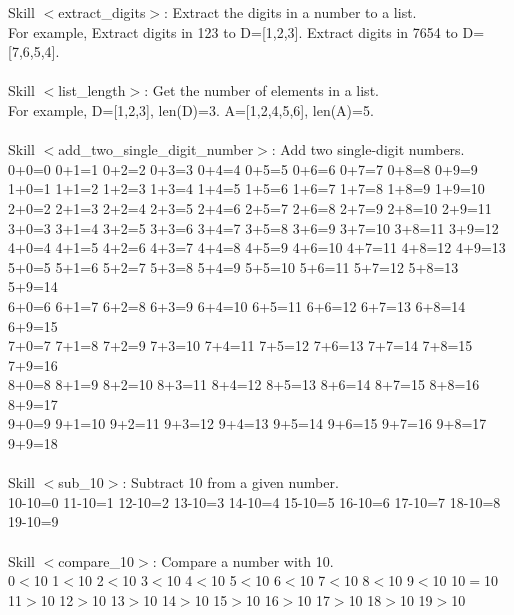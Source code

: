 \documentclass{article} %
\begin{document}
\begin{tcolorbox}[title = {Skills for Addition}, colback = Apricot!25!white, colframe = BrickRed!75!black] 
Skill $<$extract\_digits$>$: Extract the digits in a number to a list.  \\
For example, Extract digits in 123 to D=[1,2,3]. Extract digits in 7654 to D=[7,6,5,4]. \\ \\

Skill $<$list\_length$>$: Get the number of elements in a list.  \\
For example, D=[1,2,3], len(D)=3. A=[1,2,4,5,6], len(A)=5. \\ \\

Skill $<$add\_two\_single\_digit\_number$>$: Add two single-digit numbers.  \\
0+0=0 0+1=1 0+2=2 0+3=3 0+4=4 0+5=5 0+6=6 0+7=7 0+8=8 0+9=9 \\
1+0=1 1+1=2 1+2=3 1+3=4 1+4=5 1+5=6 1+6=7 1+7=8 1+8=9 1+9=10 \\
2+0=2 2+1=3 2+2=4 2+3=5 2+4=6 2+5=7 2+6=8 2+7=9 2+8=10 2+9=11 \\
3+0=3 3+1=4 3+2=5 3+3=6 3+4=7 3+5=8 3+6=9 3+7=10 3+8=11 3+9=12 \\
4+0=4 4+1=5 4+2=6 4+3=7 4+4=8 4+5=9 4+6=10 4+7=11 4+8=12 4+9=13 \\
5+0=5 5+1=6 5+2=7 5+3=8 5+4=9 5+5=10 5+6=11 5+7=12 5+8=13 5+9=14 \\
6+0=6 6+1=7 6+2=8 6+3=9 6+4=10 6+5=11 6+6=12 6+7=13 6+8=14 6+9=15 \\
7+0=7 7+1=8 7+2=9 7+3=10 7+4=11 7+5=12 7+6=13 7+7=14 7+8=15 7+9=16 \\
8+0=8 8+1=9 8+2=10 8+3=11 8+4=12 8+5=13 8+6=14 8+7=15 8+8=16 8+9=17 \\
9+0=9 9+1=10 9+2=11 9+3=12 9+4=13 9+5=14 9+6=15 9+7=16 9+8=17 9+9=18 \\ \\

Skill $<$sub\_10$>$: Subtract 10 from a given number. \\
10-10=0 11-10=1 12-10=2 13-10=3 14-10=4 15-10=5 16-10=6 17-10=7 18-10=8 19-10=9 \\ \\


Skill $<$compare\_10$>$: Compare a number with 10.  \\
0$<$10 1$<$10 2$<$10 3$<$10 4$<$10 5$<$10 6$<$10 7$<$10 8$<$10 9$<$10 10$=$10 \\
11$>$10 12$>$10 13$>$10 14$>$10 15$>$10 16$>$10 17$>$10 18$>$10 19$>$10 
\end{tcolorbox}
\noindent\begin{minipage}{\textwidth} 
 \label{Tab:simple_add_skill}
\end{minipage}
\end{document}
